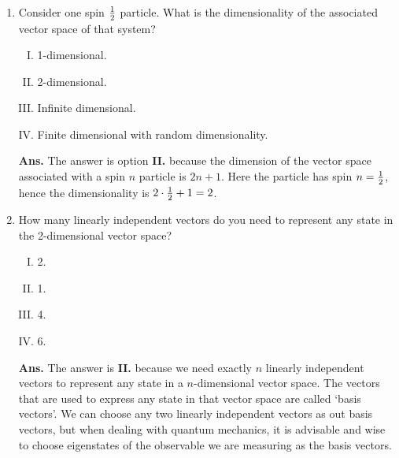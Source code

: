 \documentclass[12pt]{article}
\begin{document}
\begin{enumerate}[1.]
\item Consider one spin ${1}\over{2}$ particle. What is the dimensionality of the associated vector space of that system?
       \begin{enumerate}[I.]
              \item 1-dimensional.
              \item 2-dimensional.
              \item Infinite dimensional.
              \item Finite dimensional with random dimensionality.
       \end{enumerate}
\newpage
\textbf{Ans.} The answer is option \textbf{II.} because the dimension of the vector space associated with a spin $n$ particle is $2n+1$. Here the particle has spin $n={{1}\over{2}}$, hence the dimensionality is $2\cdot {{1}\over{2}}+1=2$.
\item How many linearly independent vectors do you need to represent any state in the 2-dimensional vector space?
       \begin{enumerate}[I.]
              \item 2.
              \item 1.
              \item 4. %
              \item 6.
       \end{enumerate}
\textbf{Ans.} The answer is \textbf{II.} because we need exactly $n$ linearly independent vectors to represent any state in a $n$-dimensional vector space. The vectors that are used to express any state in that vector space are called `basis vectors'. We can choose any two linearly independent vectors as out basis vectors, but when dealing with quantum mechanics, it is advisable and wise to choose eigenstates of the observable we are measuring as the basis vectors.


\end{enumerate}
\end{document}
